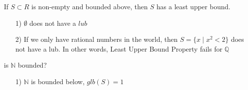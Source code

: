 

\begin{thm}
If $S\subset R$ is non-empty and bounded above, then $S$ has a least upper bound.
\end{thm}

\begin{enumerate}
\item[1)] $\emptyset$ does not have a $lub$
\item[2)] If we only have rational numbers in the world, then $S=\{x\mid x^2<2\}$ does not have a lub. In other words, Least Upper Bound Property fails for $\mathbb{Q}$
\end{enumerate}


\begin{ques}
is $\mathbb{N}$ bounded?
\end{ques}

\begin{enumerate}
\item[1)] $\mathbb{N}$ is bounded below, $glb(S) = 1$
\end{enumerate}





